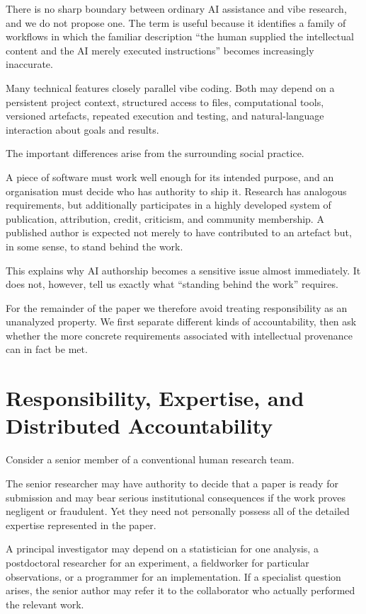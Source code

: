 There is no sharp boundary between ordinary AI assistance and vibe research, and we do not propose one. The term is useful because it identifies a family of workflows in which the familiar description ``the human supplied the intellectual content and the AI merely executed instructions'' becomes increasingly inaccurate.

Many technical features closely parallel vibe coding. Both may depend on a persistent project context, structured access to files, computational tools, versioned artefacts, repeated execution and testing, and natural-language interaction about goals and results.

The important differences arise from the surrounding social practice.

A piece of software must work well enough for its intended purpose, and an organisation must decide who has authority to ship it. Research has analogous requirements, but additionally participates in a highly developed system of publication, attribution, credit, criticism, and community membership. A published author is expected not merely to have contributed to an artefact but, in some sense, to stand behind the work.

This explains why AI authorship becomes a sensitive issue almost immediately. It does not, however, tell us exactly what ``standing behind the work'' requires.

For the remainder of the paper we therefore avoid treating responsibility as an unanalyzed property. We first separate different kinds of accountability, then ask whether the more concrete requirements associated with intellectual provenance can in fact be met.


\section{Responsibility, Expertise, and Distributed Accountability}

Consider a senior member of a conventional human research team.

The senior researcher may have authority to decide that a paper is ready for submission and may bear serious institutional consequences if the work proves negligent or fraudulent. Yet they need not personally possess all of the detailed expertise represented in the paper.

A principal investigator may depend on a statistician for one analysis, a postdoctoral researcher for an experiment, a fieldworker for particular observations, or a programmer for an implementation. If a specialist question arises, the senior author may refer it to the collaborator who actually performed the relevant work.


